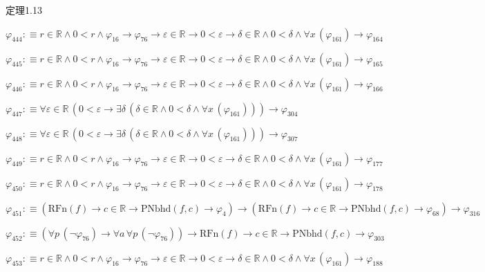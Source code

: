 \begin{fullproof}{定理1.13}
\begin{abbrevlist}
\item $\varphi_{444} :\equiv r \in \mathbb{R} \land 0 < r \land \varphi_{16} \to \varphi_{76} \to \varepsilon \in \mathbb{R} \to 0 < \varepsilon \to \delta \in \mathbb{R} \land 0 < \delta \land \forall x\,(\varphi_{161}) \to \varphi_{164}$
\item $\varphi_{445} :\equiv r \in \mathbb{R} \land 0 < r \land \varphi_{16} \to \varphi_{76} \to \varepsilon \in \mathbb{R} \to 0 < \varepsilon \to \delta \in \mathbb{R} \land 0 < \delta \land \forall x\,(\varphi_{161}) \to \varphi_{165}$
\item $\varphi_{446} :\equiv r \in \mathbb{R} \land 0 < r \land \varphi_{16} \to \varphi_{76} \to \varepsilon \in \mathbb{R} \to 0 < \varepsilon \to \delta \in \mathbb{R} \land 0 < \delta \land \forall x\,(\varphi_{161}) \to \varphi_{166}$
\item $\varphi_{447} :\equiv \forall \varepsilon \in \mathbb{R}\,(0 < \varepsilon \to \exists \delta\,(\delta \in \mathbb{R} \land 0 < \delta \land \forall x\,(\varphi_{161}))) \to \varphi_{304}$
\item $\varphi_{448} :\equiv \forall \varepsilon \in \mathbb{R}\,(0 < \varepsilon \to \exists \delta\,(\delta \in \mathbb{R} \land 0 < \delta \land \forall x\,(\varphi_{161}))) \to \varphi_{307}$
\item $\varphi_{449} :\equiv r \in \mathbb{R} \land 0 < r \land \varphi_{16} \to \varphi_{76} \to \varepsilon \in \mathbb{R} \to 0 < \varepsilon \to \delta \in \mathbb{R} \land 0 < \delta \land \forall x\,(\varphi_{161}) \to \varphi_{177}$
\item $\varphi_{450} :\equiv r \in \mathbb{R} \land 0 < r \land \varphi_{16} \to \varphi_{76} \to \varepsilon \in \mathbb{R} \to 0 < \varepsilon \to \delta \in \mathbb{R} \land 0 < \delta \land \forall x\,(\varphi_{161}) \to \varphi_{178}$
\item $\varphi_{451} :\equiv (\mathrm{RFn}(f) \to c \in \mathbb{R} \to \mathrm{PNbhd}(f,c) \to \varphi_{4}) \to (\mathrm{RFn}(f) \to c \in \mathbb{R} \to \mathrm{PNbhd}(f,c) \to \varphi_{68}) \to \varphi_{316}$
\item $\varphi_{452} :\equiv (\forall p\,(\neg \varphi_{76}) \to \forall a\,\forall p\,(\neg \varphi_{76})) \to \mathrm{RFn}(f) \to c \in \mathbb{R} \to \mathrm{PNbhd}(f,c) \to \varphi_{303}$
\item $\varphi_{453} :\equiv r \in \mathbb{R} \land 0 < r \land \varphi_{16} \to \varphi_{76} \to \varepsilon \in \mathbb{R} \to 0 < \varepsilon \to \delta \in \mathbb{R} \land 0 < \delta \land \forall x\,(\varphi_{161}) \to \varphi_{188}$

\end{abbrevlist}
\end{fullproof}
